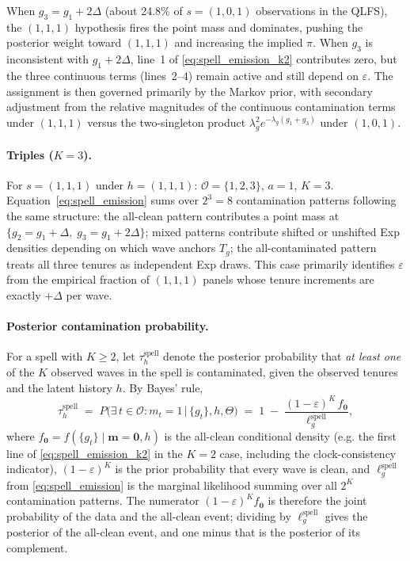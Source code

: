 When \(g_3 = g_1 + 2\Delta\) (about 24.8\% of \(s=(1,0,1)\) observations
in the QLFS), the \((1,1,1)\) hypothesis fires the point mass and
dominates, pushing the posterior weight toward \((1,1,1)\) and increasing
the implied \(\pi\). When \(g_3\) is inconsistent with \(g_1 + 2\Delta\),
line~1 of \eqref{eq:spell_emission_k2} contributes zero, but the three
continuous terms (lines~2--4) remain active and still depend on
\(\varepsilon\). The assignment is then governed primarily by the Markov
prior, with secondary adjustment from the relative magnitudes of the
continuous contamination terms under \((1,1,1)\) versus the two-singleton
product \(\lambda_g^2 e^{-\lambda_g(g_1+g_3)}\) under \((1,0,1)\).

\paragraph{Triples (\(K = 3\)).}
For \(s = (1,1,1)\) under \(h = (1,1,1)\): \(\mathcal{O} = \{1,2,3\}\),
\(a = 1\), \(K = 3\). Equation~\eqref{eq:spell_emission} sums over
\(2^3 = 8\) contamination patterns following the same structure: the
all-clean pattern contributes a point mass at
\(\{g_2 = g_1 + \Delta,\; g_3 = g_1 + 2\Delta\}\); mixed patterns
contribute shifted or unshifted Exp densities depending on which wave
anchors \(T_g\); the all-contaminated pattern treats all three tenures as
independent Exp draws. This case primarily identifies \(\varepsilon\)
from the empirical fraction of \((1,1,1)\) panels whose tenure
increments are exactly \(+\Delta\) per wave.

\paragraph{Posterior contamination probability.}
For a spell with \(K \ge 2\), let
\(\tau_h^{\mathrm{spell}}\) denote the posterior probability that
\emph{at least one} of the \(K\) observed waves in the spell is
contaminated, given the observed tenures and the latent history \(h\).
By Bayes' rule, 
\begin{equation}
\tau_h^{\mathrm{spell}} \;=\;
P\!\big(\exists\, t \in \mathcal{O} : m_t = 1 \,\big|\, \{g_t\}, h, \Theta\big)
\;=\;
1 \;-\; \frac{(1-\varepsilon)^K \, f_{\mathbf{0}}}
             {\ell^{\mathrm{spell}}_g},
\label{eq:tau_spell}
\end{equation}
where \(f_{\mathbf{0}} = f(\{g_t\} \mid \mathbf{m} = \mathbf{0}, h)\) is
the all-clean conditional density (e.g. the first line of
\eqref{eq:spell_emission_k2} in the \(K=2\) case, including the
clock-consistency indicator), \((1-\varepsilon)^K\) is the prior
probability that every wave is clean, and \(\ell^{\mathrm{spell}}_g\)
from \eqref{eq:spell_emission} is the marginal likelihood summing over
all \(2^K\) contamination patterns. The numerator
\((1-\varepsilon)^K f_{\mathbf{0}}\) is therefore the joint probability
of the data and the all-clean event; dividing by
\(\ell^{\mathrm{spell}}_g\) gives the posterior of the all-clean event,
and one minus that is the posterior of its complement.

